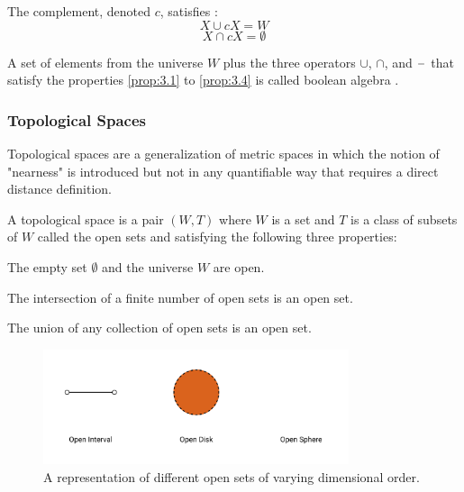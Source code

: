 \documentclass[a4paper,11pt,oneside]{article}
\newcommand{\minus}{\scalebox{0.9}[1.0]{$-$}} %
\begin{document}
\begin{property}
	\label{prop:3.4}
	The complement, denoted $c$, satisfies \cite{mansfield_1987}:
	\begin{equation*}	
		X \cup cX = W
	\end{equation*}
	\begin{equation*}
		X \cap cX = \emptyset
	\end{equation*}
	\cite{mansfield_1987}
\end{property}


    
\begin{definition}
	A set of elements from the universe $W$ plus the three operators $\cup$, $\cap$, and $\minus$ that satisfy the properties \eqref{prop:3.1} to \eqref{prop:3.4} is called boolean algebra \cite{Requicha1978MathematicalFO}.
\end{definition}
    
\subsubsection{Topological Spaces}
    
Topological spaces are a generalization of metric spaces in which the notion of "nearness" is introduced but not in any quantifiable way that requires a direct distance definition.
    
\begin{definition}
	A topological space is a pair $(W, T)$ where $W$ is a set and $T$ is a class of subsets of $W$ called the open sets and satisfying the following three properties:
	\begin{property}
		\label{ts:3.5}
		The empty set $\emptyset$ and the universe $W$ are open.\cite{mansfield_1987}
	\end{property}
	\begin{property}
		\label{ts:3.6}
		The intersection of a finite number of open sets is an open set. \cite{mansfield_1987}
	\end{property}
	\begin{property}
		\label{ts:3.7}
		The union of any collection of open sets is an open set. \cite{mansfield_1987}
	\end{property}
\end{definition}
    
\begin{figure}[ht]
	\begin{center}
		\includegraphics[width=0.8\textwidth]{section3/3.1/open.png}
	\end{center}
	\caption{A representation of different open sets of varying dimensional order.}
	\label{sect3:open_sets}
\end{figure}
    
\end{document}
